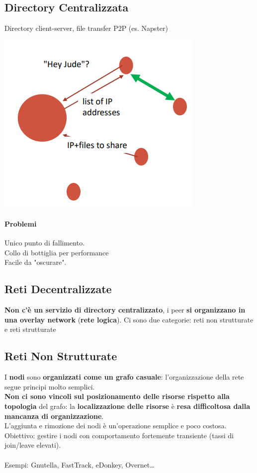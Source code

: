 \documentclass[10pt]{article}
\begin{document}
\subsection{Directory Centralizzata}
Directory client-server, file transfer P2P (es. Napster)
\begin{multicols}{2}
\begin{center}
\includegraphics[scale=0.7]{p2pdircentr.png}
\end{center}
\paragraph{Problemi} Unico punto di fallimento.\\
Collo di bottiglia per performance\\
Facile da "oscurare".
\end{multicols}
\subsection{Reti Decentralizzate}
\textbf{Non c'è un servizio di directory centralizzato}, i peer \textbf{si organizzano in una overlay network} (\textbf{rete logica}). Ci sono due categorie: reti non strutturate e reti strutturate
\subsection{Reti Non Strutturate}
I \textbf{nodi} sono \textbf{organizzati come un grafo casuale}: l'organizzazione della rete segue principi molto semplici.\\
\textbf{Non ci sono vincoli sul posizionamento delle risorse rispetto alla topologia} del grafo: la \textbf{localizzazione delle risorse} è \textbf{resa difficoltosa dalla mancanza di organizzazione}.\\
L'aggiunta e rimozione dei nodi è un'operazione semplice e poco costosa. Obiettivo: gestire i nodi con comportamento fortemente transiente (tassi di join/leave elevati).\\\\
Esempi: Gnutella, FastTrack, eDonkey, Overnet\ldots
\end{document}
